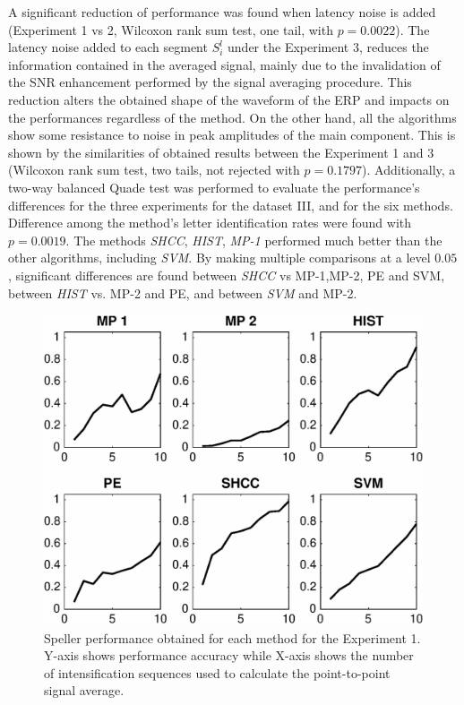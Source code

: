 A significant reduction of performance was found when latency noise is added (Experiment 1 vs 2, Wilcoxon rank sum test, one tail, with $p=0.0022$).  The latency noise added to each segment $S_i^l$ under the Experiment 3, reduces the information contained in the averaged signal, mainly due to the invalidation of the SNR enhancement performed by the signal averaging procedure.  This reduction alters the obtained shape of the waveform of the ERP and impacts on the performances regardless of the method. On the other hand, all the algorithms show some resistance to noise in peak amplitudes of the main component. This is shown by the similarities of obtained results between the Experiment 1 and 3 (Wilcoxon rank sum test, two tails, not rejected with $p=0.1797$).  Additionally, a two-way balanced Quade test was performed to evaluate the performance's differences for the three experiments for the dataset III, and for the six methods.  Difference among the method's letter identification rates were found with $p=0.0019$.  The methods \textit{SHCC}, \textit{HIST}, \textit{MP-1} performed much better than the other algorithms, including \textit{SVM}.  By making multiple comparisons at a level  $0.05$, significant differences are found between \textit{SHCC} vs MP-1,MP-2, PE and SVM, between \textit{HIST} vs. MP-2 and PE, and between \textit{SVM} and MP-2.

\begin{figure}[h!]
\centering
\includegraphics[width=15cm]{images/CrossPerformanceTest.eps}
\caption[Experiment I Pseudo-real Dataset III Speller Performance]{Speller performance obtained for each method for the Experiment 1.  Y-axis shows performance accuracy while X-axis shows the number of intensification sequences used to calculate the point-to-point signal average.}
\label{fig:performancetest}
\end{figure}

